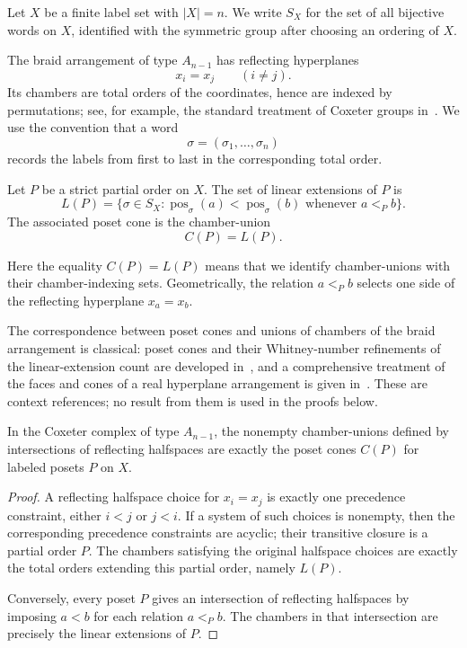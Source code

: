 Let $X$ be a finite label set with $|X|=n$.  We write $S_X$ for the set of
all bijective words on $X$, identified with the symmetric group after
choosing an ordering of $X$.

The braid arrangement of type $A_{n-1}$ has reflecting hyperplanes
\[
        x_i=x_j \qquad (i\ne j).
\]
Its chambers are total orders of the coordinates, hence are indexed by
permutations; see, for example, the standard treatment of Coxeter groups
in~\cite{BjornerBrenti2005}.  We use the convention that a word
\[
        \sigma=(\sigma_1,\ldots,\sigma_n)
\]
records the labels from first to last in the corresponding total order.

\begin{definition}
Let $P$ be a strict partial order on $X$.  The set of linear extensions of
$P$ is
\[
        L(P)=\{\sigma\in S_X:
        \operatorname{pos}_\sigma(a)<\operatorname{pos}_\sigma(b)
        \text{ whenever } a<_P b\}.
\]
The associated poset cone is the chamber-union
\[
        C(P)=L(P).
\]
\end{definition}

Here the equality $C(P)=L(P)$ means that we identify chamber-unions with
their chamber-indexing sets.  Geometrically, the relation $a<_P b$
selects one side of the reflecting hyperplane $x_a=x_b$.

The correspondence between poset cones and unions of chambers of the braid arrangement is classical: poset cones and their Whitney-number refinements of the linear-extension count are developed in~\cite{DorpalenBarryKimReiner2021}, and a comprehensive treatment of the faces and cones of a real hyperplane arrangement is given in~\cite{AguiarMahajan2017}. These are context references; no result from them is used in the proofs below.

\begin{theorem}
\label{thm:halfspace-poset-cone}
In the Coxeter complex of type $A_{n-1}$, the nonempty chamber-unions
defined by intersections of reflecting halfspaces are exactly the poset
cones $C(P)$ for labeled posets $P$ on $X$.
\end{theorem}

\begin{proof}
A reflecting halfspace choice for $x_i=x_j$ is exactly one precedence
constraint, either $i<j$ or $j<i$.  If a system of such choices is
nonempty, then the corresponding precedence constraints are acyclic; their
transitive closure is a partial order $P$.  The chambers satisfying the
original halfspace choices are exactly the total orders extending this
partial order, namely $L(P)$.

Conversely, every poset $P$ gives an intersection of reflecting
halfspaces by imposing $a<b$ for each relation $a<_P b$.  The chambers in
that intersection are precisely the linear extensions of $P$.
\end{proof}

